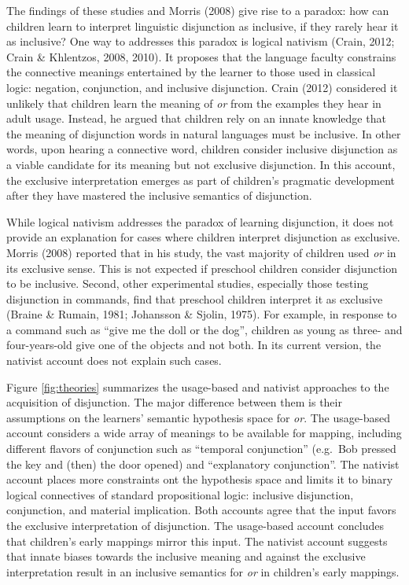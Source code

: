 \documentclass[,man,floatsintext]{apa6}
\begin{document}
The findings of these studies and Morris (2008) give rise to a paradox: how can children learn to interpret linguistic disjunction as inclusive, if they rarely hear it as inclusive? One way to addresses this paradox is logical nativism (Crain, 2012; Crain \& Khlentzos, 2008, 2010). It proposes that the language faculty constrains the connective meanings entertained by the learner to those used in classical logic: negation, conjunction, and inclusive disjunction. Crain (2012) considered it unlikely that children learn the meaning of \emph{or} from the examples they hear in adult usage. Instead, he argued that children rely on an innate knowledge that the meaning of disjunction words in natural languages must be inclusive. In other words, upon hearing a connective word, children consider inclusive disjunction as a viable candidate for its meaning but not exclusive disjunction. In this account, the exclusive interpretation emerges as part of children's pragmatic development after they have mastered the inclusive semantics of disjunction.

While logical nativism addresses the paradox of learning disjunction, it does not provide an explanation for cases where children interpret disjunction as exclusive. Morris (2008) reported that in his study, the vast majority of children used \emph{or} in its exclusive sense. This is not expected if preschool children consider disjunction to be inclusive. Second, other experimental studies, especially those testing disjunction in commands, find that preschool children interpret it as exclusive (Braine \& Rumain, 1981; Johansson \& Sjolin, 1975). For example, in response to a command such as \enquote{give me the doll or the dog}, children as young as three- and four-years-old give one of the objects and not both. In its current version, the nativist account does not explain such cases.

Figure \ref{fig:theories} summarizes the usage-based and nativist approaches to the acquisition of disjunction. The major difference between them is their assumptions on the learners' semantic hypothesis space for \emph{or}. The usage-based account considers a wide array of meanings to be available for mapping, including different flavors of conjunction such as \enquote{temporal conjunction} (e.g.~Bob pressed the key and (then) the door opened) and \enquote{explanatory conjunction}. The nativist account places more constraints ont the hypothesis space and limits it to binary logical connectives of standard propositional logic: inclusive disjunction, conjunction, and material implication. Both accounts agree that the input favors the exclusive interpretation of disjunction. The usage-based account concludes that children's early mappings mirror this input. The nativist account suggests that innate biases towards the inclusive meaning and against the exclusive interpretation result in an inclusive semantics for \emph{or} in children's early mappings.
\end{document}
